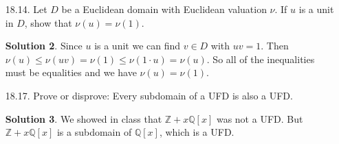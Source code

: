 \documentclass{article}
\newcommand{\QQ}{\mathbb{Q}}
\newcommand{\ZZ}{\mathbb{Z}}
\theoremstyle{definition}
\newtheorem*{solution}{Solution}
\begin{document}
\begin{enumerate}
\begin{solution}
Now suppose $a + b\sqrt{2}i, c+d\sqrt{2}i \in \ZZ[\sqrt{2}i]$ with $c + d\sqrt{2}i$ nonzero.  Let $q_1$ be the closest integer to $\frac{ac + 2bd}{c^2 + 2d^2}$ and $q_2$ the closest integer to $\frac{bc - ad}{c^2 + 2d^2}$.  Define $s_1, s_2, r_1, r_2$ by
\begin{align*}
s_1 + s_2\sqrt{2}i &= (\frac{ac + 2bd}{c^2 + 2d^2} + \frac{bc - ad}{c^2 + 2d^2}\sqrt{2}i) - (q_1 + q_2\sqrt{2}i), \\
r_1 + r_2 \sqrt{2}i &= (a + b\sqrt{2}i) - (q_1 + q_2\sqrt{2}i)(c + d\sqrt{2}i).
\end{align*}
We need to show that $r_1^2 + 2r_2^2 < c^2 + 2d^2$.  Note that $\lvert s_1 \rvert \le 1/2$ and $\lvert s_2 \rvert \le 1/2$ by the definition of $q_1$ and $q_2$.  Moreover,
\[
(s_1 + s_2\sqrt{2}i)(c + d\sqrt{2}i) = (a + b\sqrt{2}i) - (q_1 + q_2\sqrt{2}i)(c + d\sqrt{2}i) = r_1 + r_2\sqrt{2}i.
\]
Thus
\[
\nu(r_1 + r_2\sqrt{2}i) = \nu(s_1 + s_2\sqrt{2}i)\nu(c + d\sqrt{2}i) \le (\frac14 + 2 \cdot \frac14) \nu(c + d\sqrt{2}i) < \nu(c + d\sqrt{2}i)
\]
as desired.
\end{solution}
\item[18.14.] Let $D$ be a Euclidean domain with Euclidean valuation $\nu$.  If $u$ is a unit in $D$, show that $\nu(u) = \nu(1)$.
\begin{solution}
Since $u$ is a unit we can find $v \in D$ with $uv = 1$.  Then $\nu(u) \le \nu(uv) = \nu(1) \le \nu(1 \cdot u) = \nu(u)$.  So all of the inequalities must be equalities and we have $\nu(u) = \nu(1)$.
\end{solution}
\item[18.17.] Prove or disprove: Every subdomain of a UFD is also a UFD.
\begin{solution}
We showed in class that $\ZZ + x\QQ[x]$ was not a UFD.  But $\ZZ + x\QQ[x]$ is a subdomain of $\QQ[x]$, which is a UFD.
\end{solution}
\end{enumerate}
\end{document}
